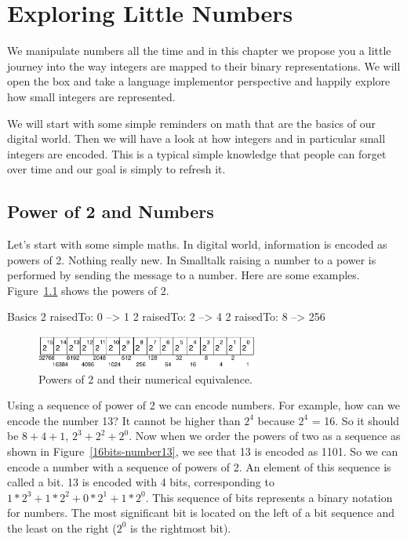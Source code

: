 \documentclass[a4paper,10pt,twoside]{book}
\begin{document}
\fi
\sloppy

\chapter{Exploring Little Numbers}

We manipulate numbers all the time and in this chapter we propose you a little journey into the way 
integers are mapped to their binary representations. We will open the box and take a language implementor perspective and happily explore how small integers are represented. 

We will start with some simple reminders on math that are the basics of our digital world. Then we will have a look at how integers and in particular small integers are encoded. This is a typical simple knowledge that people can forget over time and our goal is simply to refresh it. 

\section{Power of 2 and Numbers}
Let's start with some simple maths. In digital world, information is encoded as powers of 2. Nothing really new. In Smalltalk raising a number to a power is performed by sending the message  to a number. Here are some examples. Figure~\ref{power} shows the powers of 2. 

\begin{code}{Basics}
2 raisedTo: 0
	--> 1
2 raisedTo: 2
	--> 4
2 raisedTo: 8
	--> 256
\end{code}



\begin{figure}[h]
\begin{center}
\includegraphics[width=0.65\textwidth]{16bits-number}
\caption{Powers of 2 and their numerical equivalence.\label{power}}
\end{center}
\end{figure}

Using a sequence of power of 2 we can encode numbers.  For example, how can we encode the number 13? It cannot be higher than $2^{4}$ because $2^{4}$ = 16. So it should be $8 + 4 + 1$, $2^{3} + 2^{2} + 2^{0}$. Now when we order the powers of two as a sequence as shown in Figure~\ref{16bits-number13}, we see that 13 is encoded as 1101.  So we can encode a number with a sequence of powers of 2. An element of this sequence is called a bit. 13 is encoded with 4 bits, corresponding to  $1*2^{3} + 1*2^{2} + 0*2^{1}+ 1*2^{0}$. This sequence of bits represents a binary notation for numbers. The most significant bit is located on the left of  a bit sequence and the least on the right ($2^{0}$ is the rightmost bit).
\end{document}
